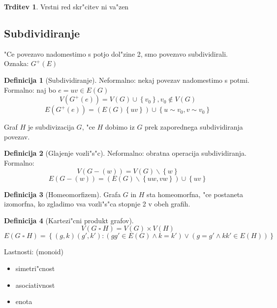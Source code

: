 \documentclass{article}
\theoremstyle{definition}
\newtheorem{definition}{Definicija}[section]
\newtheorem{claim}{Trditev}[section]
\begin{document}
	\begin{claim}
		Vrstni red skr"citev ni va"zen
	\end{claim}
	
	\subsection{Subdividiranje} 
	"Ce povezavo nadomestimo s potjo dol"zine 2, smo povezavo subdividirali. Oznaka: $G^+(E)$ \\ 
	
	\begin{definition}[Subdividiranje]
		Neformalno: nekaj povezav nadomestimo s potmi. \\
		Formalno: naj bo $e = uv \in E(G)$
		$$ V(G^+(e)) = V(G) \cup \left\lbrace v_0\right\rbrace, v_0 \notin V(G) $$
		$$ E(G^+(e)) = (E(G)\left\lbrace uv\right\rbrace) \cup \left\lbrace u \sim v_0, v \sim v_0 \right\rbrace $$
	\end{definition}
	
	Graf $H$ je subdivizacija $G$, "ce $H$ dobimo iz $G$ prek zaporednega subdividiranja povezav.
	
	\begin{definition}[Glajenje vozli"s"c] Neformalno: obratna operacija subdividiranja. \\
		Formalno: 
		$$ V(G-(w)) = V(G) \backslash \left\lbrace w\right\rbrace $$ 
		$$ E(G-(w)) = (E(G) \backslash \left\lbrace uw, vw \right\rbrace) \cup \left\lbrace uv \right\rbrace $$
	\end{definition}
	
	\begin{definition}[Homeomorfizem]
		Grafa $G$ in $H$ sta homeomorfna, "ce postaneta izomorfna, ko zgladimo vsa vozli"s"ca stopnje 2 v obeh grafih.
	\end{definition}
	
	\begin{definition}[Kartezi"cni produkt grafov]
		$$ V(G \mathrel{\square} H) = V(G) \times V(H) $$
		$$ E(G \mathrel{\square} H) = \left\lbrace (g, k)(g', k'): (gg' \in E(G) \land k=k') \lor (g=g' \land kk' \in E(H)) \right\rbrace $$
	\end{definition}
	Lastnosti: (monoid)
	\begin{itemize}
		\item simetri"cnost
		\item asociativnost
		\item enota
	\end{itemize}
\end{document}

